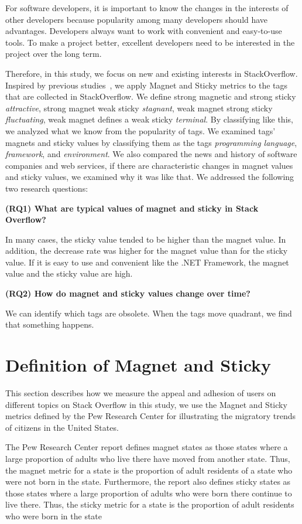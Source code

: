 \documentclass[english,preprint,JIP]{ipsj}
\begin{document}
For software developers, it is important to know the changes in the interests of other developers because popularity among many developers should have advantages. Developers always want to work with convenient and easy-to-use tools. To make a project better, excellent developers need to be interested in the project over the long term.

Therefore, in this study, we focus on new and existing interests in StackOverflow. Inspired by previous studies~\cite{yamashita2016magnet}, we apply Magnet and Sticky metrics to the tags that are collected in StackOverflow. We define strong magnetic and strong sticky \emph{attractive}, strong magnet weak sticky \emph{stagnant}, weak magnet strong sticky \emph{fluctuating}, weak magnet defines a weak sticky \emph{terminal}. By classifying like this, we analyzed what we know from the popularity of tags. We examined tags' magnets and sticky values by classifying them as the tags \emph{programming language}, \emph{framework}, and \emph{environment}. We also compared the news and history of software companies and web services, if there are characteristic changes in magnet values and sticky values, we examined why it was like that. We addressed the following two research questions:

\noindent \textbf{(RQ1) What are typical values of magnet and sticky in Stack Overflow?}\par
In many cases, the sticky value tended to be higher than the magnet value. In addition, the decrease rate was higher for the magnet value than for the sticky value. If it is easy to use and convenient like the .NET Framework, the magnet value and the sticky value are high.

\noindent \textbf{(RQ2) How do magnet and sticky values change over time?}\par
We can identify which tags are obsolete. When the tags move quadrant, we find that something happens.


\section{Definition of Magnet and Sticky}
This section describes how we measure the appeal and adhesion of users on different topics on Stack Overflow in this study, we use the Magnet and Sticky metrics defined by the Pew Research Center for illustrating the migratory trends of citizens in the United States.

The Pew Research Center report defines magnet states as those states where a large proportion of adults who live there have moved from another state. Thus, the magnet metric for a state is the proportion of adult residents of a state who were not born in the state. Furthermore, the report also defines sticky states as those states where a large proportion of adults who were born there continue to live there. Thus, the sticky metric for a state is the proportion of adult residents who were born in the state
\end{document}
